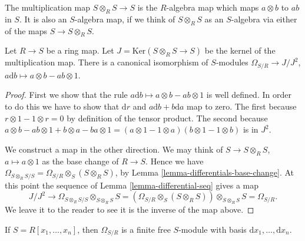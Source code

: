 \noindent
The multiplication map $S\otimes_R S \to S$ is the $R$-algebra
map which maps $a \otimes b$ to $ab$ in $S$. It is also an
$S$-algebra map, if we think of $S\otimes_R S$ as an $S$-algebra
via either of the maps $S \to S\otimes_R S$.

\begin{lemma}
\label{lemma-differentials-diagonal}
Let $R \to S$ be a ring map. Let $J = \text{Ker}(S\otimes_R S \to S)$
be the kernel of the multiplication map. There is a canonical
isomorphism of $S$-modules $\Omega_{S/R} \to J/J^2$,
$a \text{d} b \mapsto a\otimes b - ab\otimes 1$.
\end{lemma}

\begin{proof}
First we show that the rule $a \text{d} b \mapsto a\otimes b - ab\otimes 1$
is well defined. In order to do this we have to show 
that $\text{d}r$ and $a\text{d}b + b \text{d}a$ map to zero.
The first because $r\otimes 1 - 1 \otimes r = 0$ by definition
of the tensor product. The second because
$a\otimes b - ab\otimes 1 + b\otimes a - ba\otimes 1
=
(a\otimes 1 - 1\otimes a)(b\otimes 1 - 1\otimes b)
$
is in $J^2$.

\medskip\noindent
We construct a map in the other direction.
We may think of $S \to S\otimes_R S$, $a \mapsto a\otimes 1$
as the base change of $R \to S$. Hence we have
$\Omega_{S\otimes_R S/S} = \Omega_{S/R} \otimes_S (S\otimes_R S)$,
by Lemma \ref{lemma-differentials-base-change}.
At this point the sequence of Lemma \ref{lemma-differential-seq} gives a map
$$
J/J^2  \to \Omega_{S\otimes_RS/ S} \otimes_{S\otimes_R S} S
= (\Omega_{S/R} \otimes_S (S\otimes_R S))\otimes_{S\otimes_R S} S
= \Omega_{S/R}.
$$
We leave it to the reader to see it is the inverse of the map
above.
\end{proof}




\begin{lemma}
\label{lemma-differentials-polynomial-ring}
If $S = R[x_1,\ldots,x_n]$, then 
$\Omega_{S/R}$ is a finite free $S$-module with
basis $\text{d}x_1,\ldots, \text{d}x_n$.
\end{lemma}

